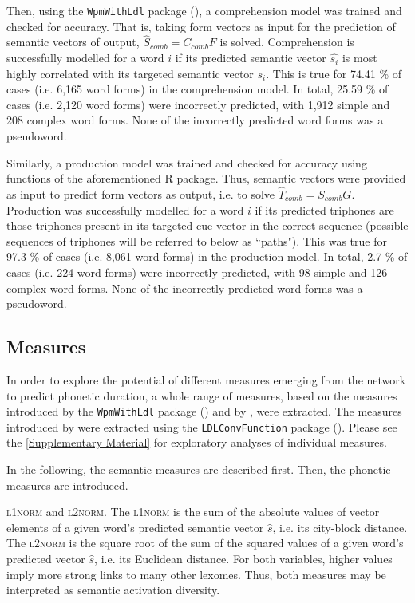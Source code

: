 Then, using the \texttt{WpmWithLdl} package (\cite{Baayen2019wpm}), a comprehension model was trained and checked for accuracy. That is, taking form vectors as input for the prediction of semantic vectors of output, $\hat{S}_{comb}=C_{comb}F$ is solved. Comprehension is successfully modelled for a word $i$ if its predicted semantic vector $\hat{s_i}$ is most highly correlated with its targeted semantic vector $s_i$. This is true for 74.41 \% of cases (i.e. 6,165 word forms) in the comprehension model. In total, 25.59 \% of cases (i.e. 2,120 word forms) were incorrectly predicted, with 1,912 simple and 208 complex word forms. None of the incorrectly predicted word forms was a pseudoword.

Similarly, a production model was trained and checked for accuracy using functions of the aforementioned R package. Thus, semantic vectors were provided as input to predict form vectors as output, i.e. to solve $\hat{T}_{comb}=S_{comb}G$. Production was successfully modelled for a word $i$ if its predicted triphones are those triphones present in its targeted cue vector in the correct sequence (possible sequences of triphones will be referred to below as ``paths"). This was true for 97.3 \% of cases (i.e. 8,061 word forms) in the production model. In total, 2.7 \% of cases (i.e. 224 word forms) were incorrectly predicted, with 98 simple and 126 complex word forms. None of the incorrectly predicted word forms was a pseudoword.

\subsection{Measures}\label{section05_1_6}

In order to explore the potential of different measures emerging from the network to predict phonetic duration, a whole range of measures, based on the measures introduced by the \texttt{WpmWithLdl} package (\cite{Baayen2019wpm}) and by \citet{Chuang2021}, were extracted. The measures introduced by \citet{Chuang2021} were extracted using the \texttt{LDLConvFunction} package (\cite{Schmitz2021ldlconv}). Please see the \ref{Supplementary Material} for exploratory analyses of individual measures.

In the following, the semantic measures are described first. Then, the phonetic measures are introduced.

\textsc{l1norm} and \textsc{l2norm}. The \textsc{l1norm} is the sum of the absolute values of vector elements of a given word’s predicted semantic vector $\hat{s}$, i.e. its city-block distance. The \textsc{l2norm} is the square root of the sum of the squared values of a given word’s predicted vector $\hat{s}$, i.e. its Euclidean distance. For both variables, higher values imply more strong links to many other lexomes. Thus, both measures may be interpreted as semantic activation diversity.


